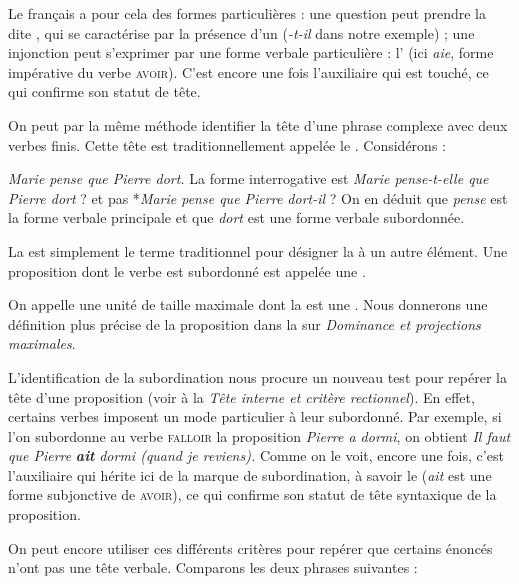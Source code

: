 Le français a pour cela des formes particulières : une question peut prendre la  dite , qui se caractérise par la présence d’un  (\textit{{}-t-il} dans notre exemple) ; une injonction peut s’exprimer par une forme verbale particulière : l’ (ici \textit{aie}, forme impérative du verbe \textsc{avoir}). C’est encore une fois l’auxiliaire qui est touché, ce qui confirme son statut de tête.

On peut par la même méthode identifier la tête d’une phrase complexe avec deux verbes finis. Cette tête est traditionnellement appelée le . Considérons :

\ea
\textit{{Marie pense que Pierre dort}.}
\z
La forme interrogative est \textit{Marie pense-t-elle que Pierre dort} ? et pas *\textit{Marie pense que Pierre dort-il} ? On en déduit que \textit{pense} est la forme verbale principale et que \textit{dort} est une forme verbale subordonnée.

{La  est simplement le terme traditionnel pour désigner la  à un autre élément.  Une proposition dont le verbe est subordonné est appelée une .}

On appelle  une unité de taille maximale dont la  est une . Nous donnerons une définition plus précise de la proposition dans la  sur \textit{Dominance et projections maximales}.

L’identification de la subordination nous procure un nouveau test pour repérer la tête d’une proposition (voir  à la  \textit{Tête interne et critère rectionnel}). En effet, certains verbes imposent un mode particulier à leur subordonné. Par exemple, si l’on subordonne au verbe \textsc{falloir} la proposition \textit{Pierre a dormi}, on obtient \textit{Il faut que Pierre} \textbf{\textit{ait}} \textit{dormi (quand je reviens).} Comme on le voit, encore une fois, c’est l’auxiliaire qui hérite ici de la marque de subordination, à savoir le  (\textit{ait} est une forme subjonctive de \textsc{avoir}), ce qui confirme son statut de tête syntaxique de la proposition.

On peut encore utiliser ces différents critères pour repérer que certains énoncés n’ont pas une tête verbale. Comparons les deux phrases suivantes :

